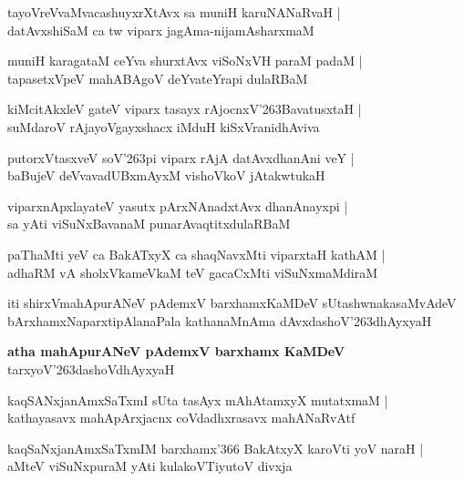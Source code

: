 \begin{shloka}
tayoVreVvaMvacashuyxrXtAvx sa muniH karuNANaRvaH |\\
datAvxshiSaM ca tw viparx jagAma-nijamAsharxmaM
\end{shloka}

\begin{shloka}
muniH karagataM ceYva shurxtAvx viSoNxVH paraM padaM |\\
tapasetxVpeV mahABAgoV deYvateYrapi dulaRBaM
\end{shloka}

\begin{shloka}
kiMcitAkxleV gateV viparx tasayx rAjocnxV\char'263BavatusxtaH |\\
suMdaroV rAjayoVgayxshacx iMduH kiSxVranidhAviva
\end{shloka}

\begin{shloka}
putorxVtasxveV soV\char'263pi viparx rAjA datAvxdhanAni veY |\\
baBujeV deVvavadUBxmAyxM vishoVkoV jAtakwtukaH
\end{shloka}

\begin{shloka}
viparxnApxlayateV yasutx pArxNAnadxtAvx dhanAnayxpi |\\
sa yAti viSuNxBavanaM punarAvaqtitxdulaRBaM 
\end{shloka}

\begin{shloka}
paThaMti yeV ca BakATxyX ca shaqNavxMti viparxtaH kathAM |\\
adhaRM vA sholxVkameVkaM teV gacaCxMti viSuNxmaMdiraM
\end{shloka}
iti shirxVmahApurANeV pAdemxV barxhamxKaMDeV sUtashwnakasaMvAdeV bArxhamxNaparxtipAlanaPala kathanaMnAma dAvxdashoV\char'263dhAyxyaH

\begin{center}
\textbf{\large atha mahApurANeV pAdemxV barxhamx KaMDeV}\\
tarxyoV\char'263dashoVdhAyxyaH
\end{center}

\setcounter{shloka}{0}
\begin{shloka}
kaqSANxjanAmxSaTxmI sUta tasAyx mAhAtamxyX mutatxmaM |\\
kathayasavx mahApArxjacnx coVdadhxrasavx mahANaRvAtf
\end{shloka}

\begin{shloka}
kaqSaNxjanAmxSaTxmIM barxhamx\char'366 BakAtxyX karoVti yoV naraH |\\
aMteV viSuNxpuraM yAti kulakoVTiyutoV divxja
\end{shloka}

